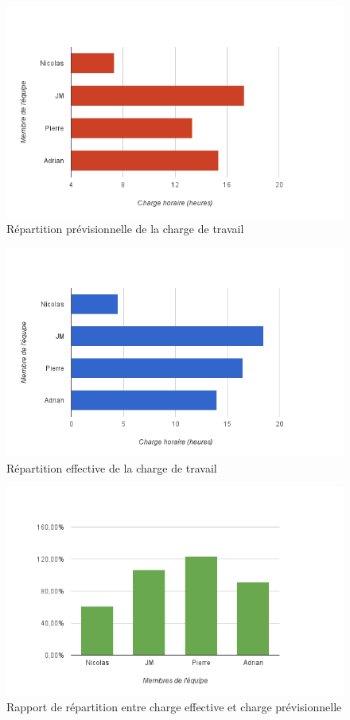\begin{figure}[H]
    \centering
    \includegraphics[width=\textwidth]{repartition-previsionnelle}
    \caption{Répartition prévisionnelle de la charge de travail}
    \label{fig:repartition-previsionnelle}
\end{figure}

\begin{figure}[H]
    \centering
    \includegraphics[width=\textwidth]{repartition-effective}
    \caption{Répartition effective de la charge de travail}
    \label{fig:repartition-effective}
\end{figure}

\begin{figure}[H]
    \centering
    \includegraphics[width=\textwidth]{rapport-repartition}
    \caption{Rapport de répartition entre charge effective et charge prévisionnelle}
    \label{fig:rapport-repartition}
\end{figure}

